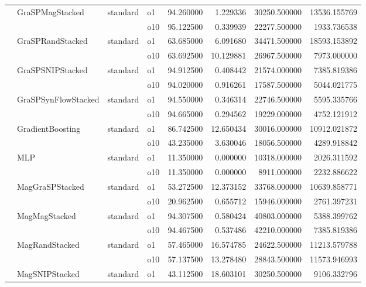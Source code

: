 \begin{longtable}{llllrrrr}
      & GraSPMagStacked & standard & o1 &  94.260000 &   1.229336 &     30250.500000 &  13536.155769 \\
      &     &         & o10 &  95.122500 &   0.339939 &     22277.500000 &   1933.736538 \\
      & GraSPRandStacked & standard & o1 &  63.685000 &   6.091680 &     34471.500000 &  18593.153892 \\
      &     &         & o10 &  63.692500 &  10.129881 &     26967.500000 &   7973.000000 \\
      & GraSPSNIPStacked & standard & o1 &  94.912500 &   0.408442 &     21574.000000 &   7385.819386 \\
      &     &         & o10 &  94.020000 &   0.916261 &     17587.500000 &   5044.021775 \\
      & GraSPSynFlowStacked & standard & o1 &  94.550000 &   0.346314 &     22746.500000 &   5595.335766 \\
      &     &         & o10 &  94.665000 &   0.294562 &     19229.000000 &   4752.121912 \\
      & GradientBoosting & standard & o1 &  86.742500 &  12.650434 &     30016.000000 &  10912.021872 \\
      &     &         & o10 &  43.235000 &   3.630046 &     18056.500000 &   4289.918842 \\
      & MLP & standard & o1 &  11.350000 &   0.000000 &     10318.000000 &   2026.311592 \\
      &     &         & o10 &  11.350000 &   0.000000 &      8911.000000 &   2232.886622 \\
      & MagGraSPStacked & standard & o1 &  53.272500 &  12.373152 &     33768.000000 &  10639.858771 \\
      &     &         & o10 &  20.962500 &   0.655712 &     15946.000000 &   2761.397231 \\
      & MagMagStacked & standard & o1 &  94.307500 &   0.580424 &     40803.000000 &   5388.399762 \\
      &     &         & o10 &  94.467500 &   0.537486 &     42210.000000 &   7385.819386 \\
      & MagRandStacked & standard & o1 &  57.465000 &  16.574785 &     24622.500000 &  11213.579788 \\
      &     &         & o10 &  57.137500 &  13.278480 &     28843.500000 &  11573.946993 \\
      & MagSNIPStacked & standard & o1 &  43.112500 &  18.603101 &     30250.500000 &   9106.332796 \\

\end{longtable}
